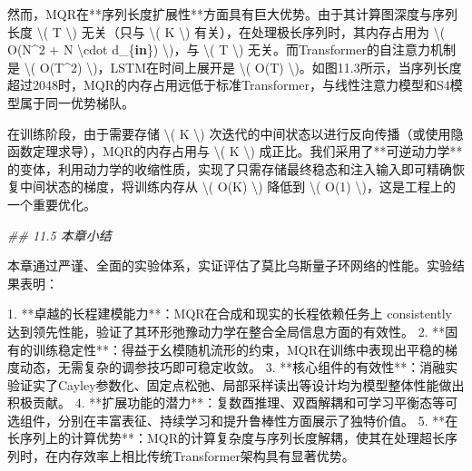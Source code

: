 \documentclass[
  12pt,
]{article}
\newenvironment{Shaded}{}{}
\newcommand{\CommentTok}[1]{\textcolor[rgb]{0.38,0.63,0.69}{\textit{#1}}}
\newcommand{\DecValTok}[1]{\textcolor[rgb]{0.25,0.63,0.44}{#1}}
\newcommand{\FloatTok}[1]{\textcolor[rgb]{0.25,0.63,0.44}{#1}}
\newcommand{\KeywordTok}[1]{\textcolor[rgb]{0.00,0.44,0.13}{\textbf{#1}}}
\newcommand{\NormalTok}[1]{#1}
\newcommand{\OperatorTok}[1]{\textcolor[rgb]{0.40,0.40,0.40}{#1}}
\begin{document}
\begin{Shaded}
\begin{Highlighting}[]
\NormalTok{然而，MQR在}\OperatorTok{**}\NormalTok{序列长度扩展性}\OperatorTok{**}\NormalTok{方面具有巨大优势。由于其计算图深度与序列长度 }\OperatorTok{\textbackslash{}}\NormalTok{( T }\OperatorTok{\textbackslash{}}\NormalTok{) 无关（只与 }\OperatorTok{\textbackslash{}}\NormalTok{( K }\OperatorTok{\textbackslash{}}\NormalTok{) 有关），在处理极长序列时，其内存占用为 }\OperatorTok{\textbackslash{}}\NormalTok{( O(N}\OperatorTok{\^{}}\DecValTok{2} \OperatorTok{+}\NormalTok{ N }\OperatorTok{\textbackslash{}}\NormalTok{cdot d\_\{}\KeywordTok{in}\NormalTok{\}) }\OperatorTok{\textbackslash{}}\NormalTok{)，与 }\OperatorTok{\textbackslash{}}\NormalTok{( T }\OperatorTok{\textbackslash{}}\NormalTok{) 无关。而Transformer的自注意力机制是 }\OperatorTok{\textbackslash{}}\NormalTok{( O(T}\OperatorTok{\^{}}\DecValTok{2}\NormalTok{) }\OperatorTok{\textbackslash{}}\NormalTok{)，LSTM在时间上展开是 }\OperatorTok{\textbackslash{}}\NormalTok{( O(T) }\OperatorTok{\textbackslash{}}\NormalTok{)。如图}\FloatTok{11.3}\NormalTok{所示，当序列长度超过}\DecValTok{2048}\NormalTok{时，MQR的内存占用远低于标准Transformer，与线性注意力模型和S4模型属于同一优势梯队。}

\NormalTok{在训练阶段，由于需要存储 }\OperatorTok{\textbackslash{}}\NormalTok{( K }\OperatorTok{\textbackslash{}}\NormalTok{) 次迭代的中间状态以进行反向传播（或使用隐函数定理求导），MQR的内存占用与 }\OperatorTok{\textbackslash{}}\NormalTok{( K }\OperatorTok{\textbackslash{}}\NormalTok{) 成正比。我们采用了}\OperatorTok{**}\NormalTok{可逆动力学}\OperatorTok{**}\NormalTok{的变体，利用动力学的收缩性质，实现了只需存储最终稳态和注入输入即可精确恢复中间状态的梯度，将训练内存从 }\OperatorTok{\textbackslash{}}\NormalTok{( O(K) }\OperatorTok{\textbackslash{}}\NormalTok{) 降低到 }\OperatorTok{\textbackslash{}}\NormalTok{( O(}\DecValTok{1}\NormalTok{) }\OperatorTok{\textbackslash{}}\NormalTok{)，这是工程上的一个重要优化。}

\CommentTok{\#\# 11.5 本章小结}

\NormalTok{本章通过严谨、全面的实验体系，实证评估了莫比乌斯量子环网络的性能。实验结果表明：}

\FloatTok{1.}  \OperatorTok{**}\NormalTok{卓越的长程建模能力}\OperatorTok{**}\NormalTok{：MQR在合成和现实的长程依赖任务上 consistently 达到领先性能，验证了其环形弛豫动力学在整合全局信息方面的有效性。}
\FloatTok{2.}  \OperatorTok{**}\NormalTok{固有的训练稳定性}\OperatorTok{**}\NormalTok{：得益于幺模随机流形的约束，MQR在训练中表现出平稳的梯度动态，无需复杂的调参技巧即可稳定收敛。}
\FloatTok{3.}  \OperatorTok{**}\NormalTok{核心组件的有效性}\OperatorTok{**}\NormalTok{：消融实验证实了Cayley参数化、固定点松弛、局部采样读出等设计均为模型整体性能做出积极贡献。}
\FloatTok{4.}  \OperatorTok{**}\NormalTok{扩展功能的潜力}\OperatorTok{**}\NormalTok{：复数酉推理、双酉解耦和可学习平衡态等可选组件，分别在丰富表征、持续学习和提升鲁棒性方面展示了独特价值。}
\FloatTok{5.}  \OperatorTok{**}\NormalTok{在长序列上的计算优势}\OperatorTok{**}\NormalTok{：MQR的计算复杂度与序列长度解耦，使其在处理超长序列时，在内存效率上相比传统Transformer架构具有显著优势。}


\end{Highlighting}
\end{Shaded}
\end{document}
